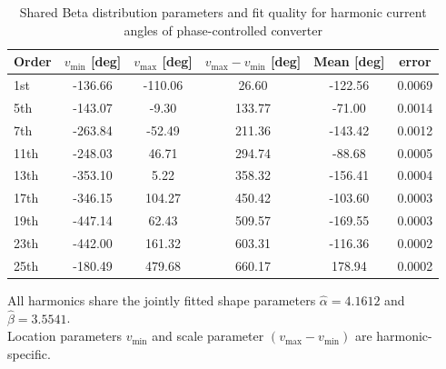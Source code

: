 \begin{table}[!b]
    \centering
    \caption{Shared Beta distribution parameters and fit quality for harmonic current angles of phase-controlled converter}
    \label{tab:beta_phase_params_pc}
    \scriptsize
    \setlength{\tabcolsep}{3pt}
    \begin{tabular}{l c c c c c}
    Order & $v_{\min}$ [deg] & $v_{\max}$ [deg] & $v_{\max}-v_{\min}$ [deg] & Mean [deg] & error \\
    \hline
    1st & -136.66 & -110.06 & 26.60 & -122.56 & 0.0069 \\
    5th & -143.07 & -9.30 & 133.77 & -71.00 & 0.0014 \\
    7th & -263.84 & -52.49 & 211.36 & -143.42 & 0.0012 \\
    11th & -248.03 & 46.71 & 294.74 & -88.68 & 0.0005 \\
    13th & -353.10 & 5.22 & 358.32 & -156.41 & 0.0004 \\
    17th & -346.15 & 104.27 & 450.42 & -103.60 & 0.0003 \\
    19th & -447.14 & 62.43 & 509.57 & -169.55 & 0.0003 \\
    23th & -442.00 & 161.32 & 603.31 & -116.36 & 0.0002 \\
    25th & -180.49 & 479.68 & 660.17 & 178.94 & 0.0002 \\
    \end{tabular}
    \vspace{2pt}
    \parbox{\columnwidth}{\scriptsize All harmonics share the jointly fitted shape parameters $\hat{\alpha}=4.1612$ and $\hat{\beta}=3.5541$. \\
    Location parameters $v_{\min}$ and scale parameter $(v_{\max} - v_{\min})$ are harmonic-specific.
    }
\end{table}


